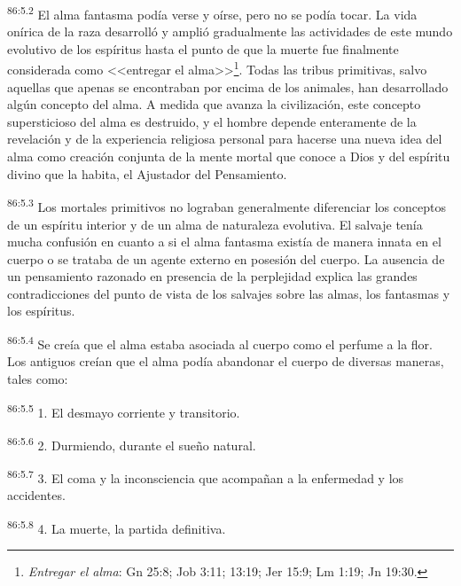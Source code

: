 \par
\textsuperscript{86:5.2} El alma fantasma podía verse y oírse, pero no se podía tocar. La vida onírica de la raza desarrolló y amplió gradualmente las actividades de este mundo evolutivo de los espíritus hasta el punto de que la muerte fue finalmente considerada como <<entregar el alma>>\footnote{\textit{Entregar el alma}: Gn 25:8; Job 3:11; 13:19; Jer 15:9; Lm 1:19; Jn 19:30.}. Todas las tribus primitivas, salvo aquellas que apenas se encontraban por encima de los animales, han desarrollado algún concepto del alma. A medida que avanza la civilización, este concepto supersticioso del alma es destruido, y el hombre depende enteramente de la revelación y de la experiencia religiosa personal para hacerse una nueva idea del alma como creación conjunta de la mente mortal que conoce a Dios y del espíritu divino que la habita, el Ajustador del Pensamiento.

\par
\textsuperscript{86:5.3} Los mortales primitivos no lograban generalmente diferenciar los conceptos de un espíritu interior y de un alma de naturaleza evolutiva. El salvaje tenía mucha confusión en cuanto a si el alma fantasma existía de manera innata en el cuerpo o se trataba de un agente externo en posesión del cuerpo. La ausencia de un pensamiento razonado en presencia de la perplejidad explica las grandes contradicciones del punto de vista de los salvajes sobre las almas, los fantasmas y los espíritus.

\par
\textsuperscript{86:5.4} Se creía que el alma estaba asociada al cuerpo como el perfume a la flor. Los antiguos creían que el alma podía abandonar el cuerpo de diversas maneras, tales como:

\par
\textsuperscript{86:5.5} 1. El desmayo corriente y transitorio.

\par
\textsuperscript{86:5.6} 2. Durmiendo, durante el sueño natural.

\par
\textsuperscript{86:5.7} 3. El coma y la inconsciencia que acompañan a la enfermedad y los accidentes.

\par
\textsuperscript{86:5.8} 4. La muerte, la partida definitiva.

